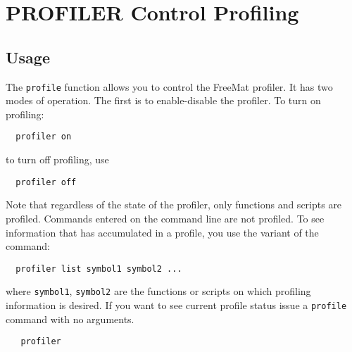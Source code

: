 \section{PROFILER Control Profiling}

\subsection{Usage}

The \verb|profile| function allows you to control the FreeMat profiler.
It has two modes of operation.  The first is to enable-disable
the profiler.  To turn on profiling:
\begin{verbatim}
  profiler on
\end{verbatim}
to turn off profiling, use
\begin{verbatim}
  profiler off
\end{verbatim}
Note that regardless of the state of the profiler, only functions
and scripts are profiled.  Commands entered on the command line
are not profiled.  To see information that has accumulated in a
profile, you use the variant of the command:
\begin{verbatim}
  profiler list symbol1 symbol2 ...
\end{verbatim}
where \verb|symbol1|, \verb|symbol2| are the functions or scripts on which
profiling information is desired.  If you want to see current profile
status issue a \verb|profile| command with no arguments.
\begin{verbatim}
   profiler
\end{verbatim}
